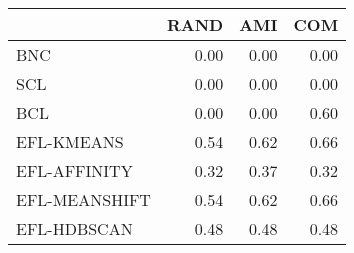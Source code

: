 \begin{tabular}{lrrr}
\toprule
 & RAND & AMI & COM \\
\midrule
BNC & 0.00 & 0.00 & 0.00 \\
SCL & 0.00 & 0.00 & 0.00 \\
BCL & 0.00 & 0.00 & 0.60 \\
EFL-KMEANS & 0.54 & 0.62 & 0.66 \\
EFL-AFFINITY & 0.32 & 0.37 & 0.32 \\
EFL-MEANSHIFT & 0.54 & 0.62 & 0.66 \\
EFL-HDBSCAN & 0.48 & 0.48 & 0.48 \\
\bottomrule
\end{tabular}
